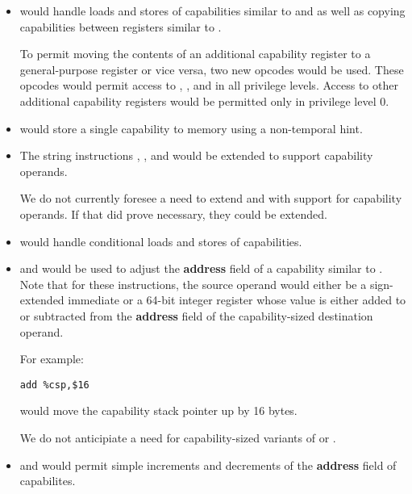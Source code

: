 \begin{itemize}
  \item {} would handle loads and stores of
    capabilities similar to  and  as well as
    copying capabilities between registers similar to .

    To permit moving the contents of an additional capability register
    to a general-purpose register or vice versa, two new
     opcodes would be
    used.  These opcodes would permit access to \CFS{}, \CGS{}, and
    \DDC{} in all privilege levels.  Access to other additional
    capability registers would be permitted only in privilege level 0.

  \item {} would store a single capability to memory
    using a non-temporal hint.

  \item The string instructions , ,
    and  would be extended to support capability
    operands.

    We do not currently foresee a need to extend  and
     with support for capability operands.  If that
    did prove necessary, they could be extended.

  \item {} would handle conditional loads and stores of
    capabilities.

  \item {} and  would be used to adjust
    the \textbf{address} field of a capability similar to .  Note
    that for these instructions, the source operand would either be a
    sign-extended immediate or a 64-bit integer register whose value
    is either added to or subtracted from the \textbf{address} field of the
    capability-sized destination operand.

    For example:

\begin{verbatim}
add %csp,$16
\end{verbatim}

    would move the capability stack pointer up by 16 bytes.

    We do not anticipiate a need for capability-sized variants of
     or .

  \item {} and  would permit
    simple increments and decrements of the \textbf{address} field of
    capabilites.


\end{itemize}
